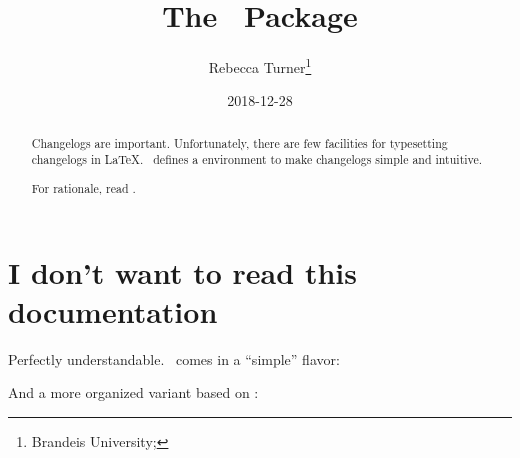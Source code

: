 \documentclass{ltxdoc}
\author{Rebecca Turner\thanks{Brandeis University; \email{rebeccaturner@brandeis.edu}}}
\title{The \cl\ Package}
\date{2018-12-28}
\begin{document}
\maketitle

\begin{abstract}
	Changelogs are important. Unfortunately, there are few facilities
	for typesetting changelogs in \LaTeX. \cl\ defines a 
	environment to make changelogs simple and intuitive.
	
	For rationale, read \keepachangelog.
\end{abstract}


\tableofcontents
\vfill
\pagebreak

\section{I don't want to read this documentation}

Perfectly understandable. \cl\ comes in a ``simple'' flavor:

\begin{mdframed}
\begin{lstsample}{}{}
\end{lstsample}
\end{mdframed}

And a more organized variant based on \keepachangelog:

\begin{mdframed}
\begin{lstsample}{}{}
\end{lstsample}
\end{mdframed}
\end{document}
